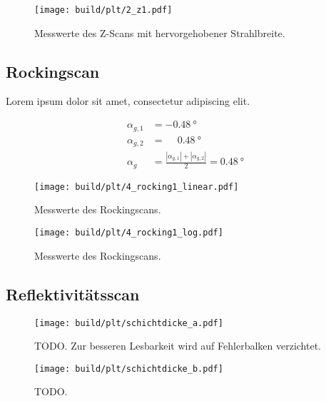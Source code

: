 \begin{figure}
    \centering
    \texttt{[image: build/plt/2\_z1.pdf]}
    \caption{Messwerte des Z-Scans mit hervorgehobener Strahlbreite.}
    \label{fig:plt:2_z1}
\end{figure}


\FloatBarrier
\subsection{Rockingscan}
Lorem ipsum dolor sit amet, consectetur adipiscing elit.

\begin{align*}
    \alpha_{g, 1} &= \SI{-0.48}{\degree} \\
    \alpha_{g, 2} &= \phantom{-} \SI{0.48}{\degree} \\
    \alpha_g &= \frac{|\alpha_{g, 1}| + |\alpha_{g, 2}|}{2}
        = \SI{0.48}{\degree}
\end{align*}

\begin{figure}
    \centering
    \texttt{[image: build/plt/4\_rocking1\_linear.pdf]}
    \caption{Messwerte des Rockingscans.}
    \label{fig:plt:4_rocking1_linear}
\end{figure}

\begin{figure}
    \centering
    \texttt{[image: build/plt/4\_rocking1\_log.pdf]}
    \caption{Messwerte des Rockingscans.}
    \label{fig:plt:4_rocking1_log}
\end{figure}


\FloatBarrier
\subsection{Reflektivitätsscan}

\begin{figure}
    \centering
    \texttt{[image: build/plt/schichtdicke\_a.pdf]}
    \caption{
        TODO.
        Zur besseren Lesbarkeit wird auf Fehlerbalken verzichtet.
    }
    \label{fig:plt:schichtdicke_a}
\end{figure}
\begin{figure}
    \centering
    \texttt{[image: build/plt/schichtdicke\_b.pdf]}
    \caption{TODO.}
    \label{fig:plt:schichtdicke_b}
\end{figure}
